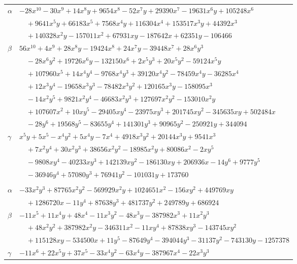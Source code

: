 \documentclass[11pt]{article}
\begin{document}
\begin{longtable}{@{}ll@{}}
$\alpha$ & $-28x^{10}-30x^{9}+14x^{8}y+9654x^{8}-52x^{7}y+29390x^{7}-19631x^{6}y+105248x^{6}$\\
 & $\quad +9641x^{5}y+66183x^{5}+7568x^{4}y+116304x^{4}+153517x^{3}y+44392x^{3}$\\
 & $\quad +140328x^{2}y-157011x^{2}+67931xy-187642x+62351y-106466$\\
$\beta$ & $56x^{10}+4x^{9}+28x^{8}y-19424x^{8}+24x^{7}y-39448x^{7}+28x^{6}y^{3}$\\
 & $\quad -28x^{6}y^{2}+19726x^{6}y-132150x^{6}+2x^{5}y^{3}+20x^{5}y^{2}-59124x^{5}y$\\
 & $\quad +107960x^{5}+14x^{4}y^{4}-9768x^{4}y^{3}+39120x^{4}y^{2}-78459x^{4}y-36285x^{4}$\\
 & $\quad +12x^{3}y^{4}-19658x^{3}y^{3}-78482x^{3}y^{2}+120165x^{3}y-158095x^{3}$\\
 & $\quad -14x^{2}y^{5}+9821x^{2}y^{4}-46683x^{2}y^{3}+127697x^{2}y^{2}-153010x^{2}y$\\
 & $\quad +107607x^{2}+10xy^{5}-29405xy^{4}-23975xy^{3}+201745xy^{2}-345635xy+502484x$\\
 & $\quad -28y^{6}+19568y^{5}-83655y^{4}+141301y^{3}+90965y^{2}-250921y+344094$\\
$\gamma$ & $x^{5}y+5x^{5}-x^{4}y^{2}+5x^{4}y-7x^{4}+4918x^{3}y^{2}+20144x^{3}y+9541x^{3}$\\
 & $\quad +7x^{2}y^{4}+30x^{2}y^{3}+38656x^{2}y^{2}-18985x^{2}y+80086x^{2}-2xy^{5}$\\
 & $\quad -9808xy^{4}-40233xy^{3}+142139xy^{2}-186130xy+206936x-14y^{6}+9777y^{5}$\\
 & $\quad -36946y^{4}+57080y^{3}+76941y^{2}-101031y+173760$\\
\addlinespace[3pt]
\multicolumn{2}{@{}l}{$\{i,j\}=\{29,165\}$, $k_{ij}=2^{5}\cdot 7^{2}\cdot 13^{2}$}\\
$\alpha$ & $-33x^{2}y^{3}+87765x^{2}y^{2}-569929x^{2}y+1024651x^{2}-156xy^{2}+449769xy$\\
 & $\quad +1286720x-11y^{4}+87638y^{3}+481737y^{2}+249789y+686924$\\
$\beta$ & $-11x^{5}+11x^{4}y+48x^{4}-11x^{3}y^{2}-48x^{3}y-387982x^{3}+11x^{2}y^{3}$\\
 & $\quad +48x^{2}y^{2}+387982x^{2}y-346311x^{2}-11xy^{4}+87838xy^{3}-143745xy^{2}$\\
 & $\quad +115128xy-534500x+11y^{5}-87649y^{4}-394044y^{3}-31137y^{2}-743130y-1257378$\\
$\gamma$ & $-11x^{6}+22x^{5}y+37x^{5}-33x^{4}y^{2}-63x^{4}y-387967x^{4}-22x^{3}y^{3}$\\

\end{longtable}
\end{document}
